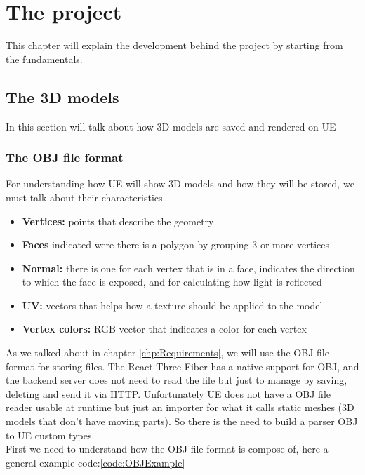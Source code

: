 
\chapter{The project}
\label{chp:project}
\noindent
This chapter will explain the development behind the project by starting from the fundamentals.
\section{The 3D models}
\noindent
In this section will talk about how 3D models are saved and rendered on \ac{UE}
\subsection{The OBJ file format}
\noindent
For understanding how \ac{UE} will show 3D models and how they will be stored, we must talk about their characteristics.

\begin{itemize}
    \item \textbf{Vertices:} points that describe the geometry
    \item \textbf{Faces} indicated were there is a polygon by grouping 3 or more vertices 
    \item \textbf{Normal:} there is one for each vertex that is in a face, indicates the direction to which the face is exposed, and for calculating how light is reflected
    \item \textbf{UV:} vectors that helps how a texture should be applied to the model
    \item \textbf{Vertex colors:} RGB vector that indicates a color for each vertex
\end{itemize}
\noindent
As we talked about in chapter \ref{chp:Requirements}, we will use the OBJ file format for storing files.
The React Three Fiber has a native support for OBJ, and the backend server does not need to read the file but just to manage by saving, deleting and send it via \ac{HTTP}.
Unfortunately \ac{UE} does not have a OBJ file reader usable at runtime but just an importer for what it calls static meshes (3D models that don't have moving parts).
So there is the need to build a parser OBJ to \ac{UE} custom types.\\
First we need to understand how the OBJ file format is compose of, here a general example code:\ref{code:OBJExample}

